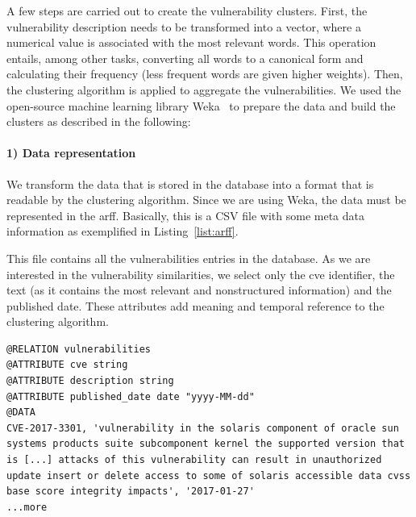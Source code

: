 A few steps are carried out to create the vulnerability clusters. 
First, the vulnerability description needs to be transformed into a vector, where a numerical value is associated with the most relevant words. 
This operation entails, among other tasks, converting all words to a canonical form and calculating their frequency (less frequent words are given higher weights).
Then, the clustering algorithm is applied to aggregate the vulnerabilities. 
We used the open-source machine learning library Weka~\cite{weka} to prepare the data and build the clusters as described in the following:



\paragraph{1) Data representation}
We transform the data that is stored in the database into a format that is readable by the clustering algorithm. 
Since we are using Weka, the data must be represented in the \gls{arff}. 
Basically, this is a CSV file with some meta data information as exemplified in Listing~\ref{list:arff}.


This file contains all the vulnerabilities entries in the database. 
As we are interested in the vulnerability similarities, we select only the \gls{cve} identifier, the text (as it contains the most relevant and nonstructured information) and the published date.
These attributes add meaning and temporal reference to the clustering algorithm.

\begin{lstlisting}[style=mystyle,caption=ARFF file describing a vulnerability.,label=list:arff]
@RELATION vulnerabilities
@ATTRIBUTE cve string
@ATTRIBUTE description string
@ATTRIBUTE published_date date "yyyy-MM-dd"
@DATA
CVE-2017-3301, 'vulnerability in the solaris component of oracle sun systems products suite subcomponent kernel the supported version that is [...] attacks of this vulnerability can result in unauthorized update insert or delete access to some of solaris accessible data cvss base score integrity impacts', '2017-01-27'
...more
\end{lstlisting}


